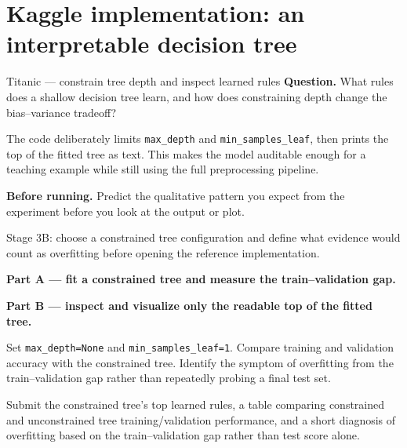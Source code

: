 \section{Kaggle implementation: an interpretable decision tree}
\label{sec:kaggle-titanic-tree}

\begin{kaggleproject}{Titanic --- constrain tree depth and inspect learned rules}
\textbf{Question.} What rules does a shallow decision tree learn, and how does constraining depth change the bias--variance tradeoff?
\end{kaggleproject}

The code deliberately limits \texttt{max\_depth} and \texttt{min\_samples\_leaf}, then prints the top of the fitted tree as text. This makes the model auditable enough for a teaching example while still using the full preprocessing pipeline.

\textbf{Before running.} Predict the qualitative pattern you expect from the experiment before you look at the output or plot.

\begin{labmode}
Stage 3B: choose a constrained tree configuration and define what evidence would count as overfitting before opening the reference implementation.
\end{labmode}

\textbf{Part A --- fit a constrained tree and measure the train--validation gap.}



\textbf{Part B --- inspect and visualize only the readable top of the fitted tree.}




\begin{debugtask}
Set \texttt{max\_depth=None} and \texttt{min\_samples\_leaf=1}. Compare training and validation accuracy with the constrained tree. Identify the symptom of overfitting from the train--validation gap rather than repeatedly probing a final test set.
\end{debugtask}

\begin{labdeliverable}
Submit the constrained tree's top learned rules, a table comparing constrained and unconstrained tree training/validation performance, and a short diagnosis of overfitting based on the train--validation gap rather than test score alone.
\end{labdeliverable}
